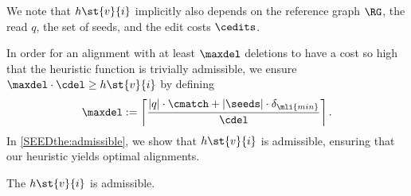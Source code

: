 We note that $h\st{v}{i}$ implicitly also depends on the reference graph $\RG$,
the read $q$, the set of seeds, and the edit costs $\cedits$.

In order for an alignment with at least $\maxdel$ deletions to have a cost so
high that the heuristic function is trivially admissible, we ensure $\maxdel
\cdot \cdel \geq h\st{v}{i}$ by defining
\begin{align} \label{SEEDeq:maximum-deletions}
	\maxdel := \left\lceil \frac{\lvert q \rvert \cdot \cmatch + |\seeds| \cdot \delta_{\mli{min}}}{\cdel} \right\rceil.
\end{align}
%
In \cref{SEEDthe:admissible}, we show that $h\st{v}{i}$ is admissible, ensuring that
our heuristic yields optimal alignments.


\begin{thm}[Admissibility]
	\label{SEEDthe:admissible}
	The \seedh $h\st{v}{i}$ is admissible.
\end{thm}
